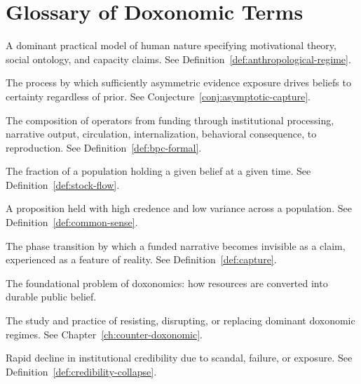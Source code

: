 \chapter{Glossary of Doxonomic Terms}
\label{app:glossary}

\begin{description}[style=nextline, leftmargin=3cm]

\item[Anthropological regime] A dominant practical model of human nature specifying motivational theory, social ontology, and capacity claims. See Definition~\ref{def:anthropological-regime}.

\item[Asymptotic capture] The process by which sufficiently asymmetric evidence exposure drives beliefs to certainty regardless of prior. See Conjecture~\ref{conj:asymptotic-capture}.

\item[Belief production chain] The composition of operators from funding through institutional processing, narrative output, circulation, internalization, behavioral consequence, to reproduction. See Definition~\ref{def:bpc-formal}.

\item[Belief stock] The fraction of a population holding a given belief at a given time. See Definition~\ref{def:stock-flow}.

\item[Common sense] A proposition held with high credence and low variance across a population. See Definition~\ref{def:common-sense}.

\item[Common-sense capture] The phase transition by which a funded narrative becomes invisible as a claim, experienced as a feature of reality. See Definition~\ref{def:capture}.

\item[Conversion problem] The foundational problem of doxonomics: how resources are converted into durable public belief.

\item[Counter-doxonomics] The study and practice of resisting, disrupting, or replacing dominant doxonomic regimes. See Chapter~\ref{ch:counter-doxonomic}.

\item[Credibility collapse] Rapid decline in institutional credibility due to scandal, failure, or exposure. See Definition~\ref{def:credibility-collapse}.


\end{description}
